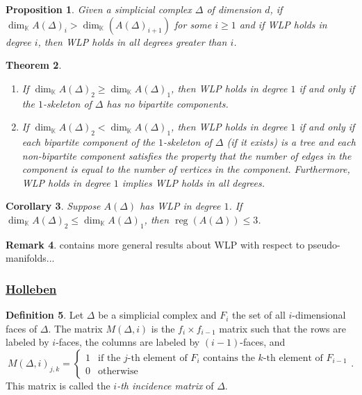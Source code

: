 \documentclass[12pt,a4paper]{article}
\newcommand{\KK}{\mathbb{K}}
\DeclareMathOperator{\reg}{reg}
\newtheorem{theorem}{Theorem}[section]
\newtheorem{corollary}[theorem]{Corollary}
\newtheorem{proposition}[theorem]{Proposition}
\theoremstyle{definition}
\newtheorem{definition}[theorem]{Definition}
\newtheorem{remark}[theorem]{Remark}
\numberwithin{equation}{section}
\begin{document}
\begin{proposition}{\cite[Proposition 2.6]{dao_lefschetz_2024}}
    Given a simplicial complex $\Delta$ of dimension $d$, if $\dim_{\KK}{A(\Delta)_i} > \dim_{\KK}(A(\Delta)_{i+1})$ for some $i \geq 1$ and if WLP holds in degree $i$, then WLP holds in all degrees greater than $i$.
\end{proposition}

\begin{theorem}{\cite[Theorem 3.3]{dao_lefschetz_2024}}
    \begin{enumerate}[label=(\roman*)]
        \item If $\dim_{\KK}{A(\Delta)_2} \geq \dim_{\KK}{A(\Delta)_1}$, then WLP holds in degree $1$ if and only if the $1$-skeleton of $\Delta$ has no bipartite components.

        \item If $\dim_{\KK}{A(\Delta)_2} < \dim_{\KK}{A(\Delta)_1}$, then WLP holds in degree $1$ if and only if each bipartite component of the $1$-skeleton of $\Delta$ (if it exists) is a tree and each non-bipartite component satisfies the property that the number of edges in the component is equal to the number of vertices in the component.
        Furthermore, WLP holds in degree $1$ implies WLP holds in all degrees.
    \end{enumerate}
\end{theorem}

\begin{corollary}{\cite[Corollary 3.6]{dao_lefschetz_2024}}
    Suppose $A(\Delta)$ has WLP in degree $1$.
    If $\dim_{\KK}{A(\Delta)_2} \leq \dim_{\KK}{A(\Delta)_1}$, then $\reg(A(\Delta)) \leq 3$.
\end{corollary}

\begin{remark}
    \cite{dao_lefschetz_2024} contains more general results about WLP with respect to pseudo-manifolds...
\end{remark}

\subsubsection{\href{https://arxiv.org/abs/2306.13274}{Holleben}}
\begin{definition}{\cite[Definition 17]{holleben_weak_2024}}
    Let $\Delta$ be a simplicial complex and $F_i$ the set of all $i$-dimensional faces of $\Delta$.
    The matrix $M(\Delta, i)$ is the $f_i \times f_{i-1}$ matrix such that the rows are labeled by $i$-faces, the columns are labeled by $(i-1)$-faces, and
    \begin{equation*}
        M(\Delta, i)_{j,k} = \begin{cases}
            1 & \text{if the } j \text{-th element of } F_i \text{ contains the } k \text{-th element of } F_{i-1} \\
            0 & \text{otherwise}
        \end{cases}.
    \end{equation*}
    This matrix is called the \emph{$i$-th incidence matrix} of $\Delta$.
\end{definition}
\end{document}
